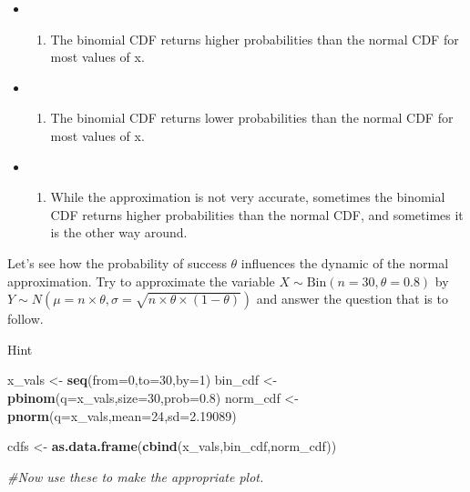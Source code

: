 \documentclass[
]{book}
\newenvironment{Shaded}{\begin{snugshade}}{\end{snugshade}}
\newcommand{\AttributeTok}[1]{\textcolor[rgb]{0.13,0.29,0.53}{#1}}
\newcommand{\CommentTok}[1]{\textcolor[rgb]{0.56,0.35,0.01}{\textit{#1}}}
\newcommand{\DecValTok}[1]{\textcolor[rgb]{0.00,0.00,0.81}{#1}}
\newcommand{\FloatTok}[1]{\textcolor[rgb]{0.00,0.00,0.81}{#1}}
\newcommand{\FunctionTok}[1]{\textcolor[rgb]{0.13,0.29,0.53}{\textbf{#1}}}
\newcommand{\NormalTok}[1]{#1}
\newcommand{\OtherTok}[1]{\textcolor[rgb]{0.56,0.35,0.01}{#1}}
\providecommand{\tightlist}{%
  \setlength{\itemsep}{0pt}\setlength{\parskip}{0pt}}
\begin{document}
\begin{itemize}
\item
  \begin{enumerate}
  \def\labelenumi{(\Alph{enumi})}
  \tightlist
  \item
    The binomial CDF returns higher probabilities than the normal CDF for most values of x.\\
  \end{enumerate}
\item
  \begin{enumerate}
  \def\labelenumi{(\Alph{enumi})}
  \setcounter{enumi}{1}
  \tightlist
  \item
    The binomial CDF returns lower probabilities than the normal CDF for most values of x.\\
  \end{enumerate}
\item
  \begin{enumerate}
  \def\labelenumi{(\Alph{enumi})}
  \setcounter{enumi}{2}
  \tightlist
  \item
    While the approximation is not very accurate, sometimes the binomial CDF returns higher probabilities than the normal CDF, and sometimes it is the other way around.
  \end{enumerate}
\end{itemize}

Let's see how the probability of success \(\theta\) influences the dynamic of the normal approximation. Try to approximate the variable \(X \sim \mbox{Bin}(n=30,\theta=0.8)\) by \(Y \sim N\left(\mu=n \times \theta,\sigma=\sqrt{n \times \theta \times (1-\theta)}\right)\) and answer the question that is to follow.

Hint

\begin{Shaded}
\begin{Highlighting}[]
\NormalTok{x\_vals }\OtherTok{\textless{}{-}} \FunctionTok{seq}\NormalTok{(}\AttributeTok{from=}\DecValTok{0}\NormalTok{,}\AttributeTok{to=}\DecValTok{30}\NormalTok{,}\AttributeTok{by=}\DecValTok{1}\NormalTok{)}
\NormalTok{bin\_cdf }\OtherTok{\textless{}{-}} \FunctionTok{pbinom}\NormalTok{(}\AttributeTok{q=}\NormalTok{x\_vals,}\AttributeTok{size=}\DecValTok{30}\NormalTok{,}\AttributeTok{prob=}\FloatTok{0.8}\NormalTok{)}
\NormalTok{norm\_cdf }\OtherTok{\textless{}{-}} \FunctionTok{pnorm}\NormalTok{(}\AttributeTok{q=}\NormalTok{x\_vals,}\AttributeTok{mean=}\DecValTok{24}\NormalTok{,}\AttributeTok{sd=}\FloatTok{2.19089}\NormalTok{)}

\NormalTok{cdfs }\OtherTok{\textless{}{-}} \FunctionTok{as.data.frame}\NormalTok{(}\FunctionTok{cbind}\NormalTok{(x\_vals,bin\_cdf,norm\_cdf))}

\CommentTok{\#Now use these to make the appropriate plot.}
\end{Highlighting}
\end{Shaded}
\end{document}
